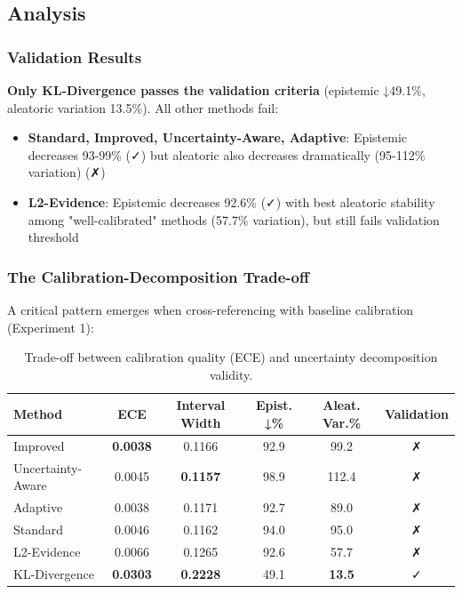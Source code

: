 \subsection{Analysis}

\subsubsection{Validation Results}

\textbf{Only KL-Divergence passes the validation criteria} (epistemic ↓49.1\%, aleatoric variation 13.5\%). All other methods fail:

\begin{itemize}
\item \textbf{Standard, Improved, Uncertainty-Aware, Adaptive}: Epistemic decreases 93-99\% (✓) but aleatoric also decreases dramatically (95-112\% variation) (✗)
\item \textbf{L2-Evidence}: Epistemic decreases 92.6\% (✓) with best aleatoric stability among "well-calibrated" methods (57.7\% variation), but still fails validation threshold
\end{itemize}

\subsubsection{The Calibration-Decomposition Trade-off}

A critical pattern emerges when cross-referencing with baseline calibration (Experiment 1):

\begin{table}[htbp]
\centering
\caption{Trade-off between calibration quality (ECE) and uncertainty decomposition validity.}
\label{tab:calibration_decomposition_tradeoff}
\begin{tabular}{lccccc}
\toprule
\textbf{Method} & \textbf{ECE} & \textbf{Interval Width} & \textbf{Epist. ↓\%} & \textbf{Aleat. Var.\%} & \textbf{Validation} \\
\midrule
Improved & \textbf{0.0038} & 0.1166 & 92.9 & 99.2 & ✗ \\
Uncertainty-Aware & 0.0045 & \textbf{0.1157} & 98.9 & 112.4 & ✗ \\
Adaptive & 0.0038 & 0.1171 & 92.7 & 89.0 & ✗ \\
Standard & 0.0046 & 0.1162 & 94.0 & 95.0 & ✗ \\
L2-Evidence & 0.0066 & 0.1265 & 92.6 & 57.7 & ✗ \\
KL-Divergence & \textbf{0.0303} & \textbf{0.2228} & 49.1 & \textbf{13.5} & ✓ \\
\bottomrule
\end{tabular}
\end{table}

